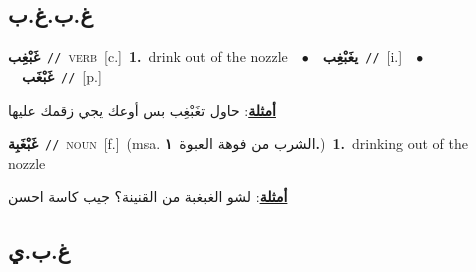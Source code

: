 \documentclass[10pt,a4paper,twoside]{article} %
\begin{document}
\begin{multicols}{2}
{{\vspace{-3mm}
\subsection*{\color{blue}\foreignlanguage{arabic}{غ.ب.غ.ب}\color{blue}{}} 

{\setlength\topsep{0pt}\textbf{\foreignlanguage{arabic}{غَبْغِب}}\ {\color{gray}\texttt{//}\color{black}}\ \textsc{verb}\ [c.]\ \textbf{1.}~drink out of the nozzle\ \ $\bullet$\ \ \setlength\topsep{0pt}\textbf{\foreignlanguage{arabic}{يغَبْغِب}}\ {\color{gray}\texttt{//}\color{black}}\ [i.]\ \ $\bullet$\ \ \setlength\topsep{0pt}\textbf{\foreignlanguage{arabic}{غَبْغَب}}\ {\color{gray}\texttt{//}\color{black}}\ [p.]\  \begin{flushright}\color{gray}\foreignlanguage{arabic}{\textbf{\underline{\foreignlanguage{arabic}{أمثلة}}}: حاول تغَبْغِب بس أوعك يجي زقمك عليها}\end{flushright}\color{black}} \vspace{2mm}

{\setlength\topsep{0pt}\textbf{\foreignlanguage{arabic}{غَبْغَبِة}}\ {\color{gray}\texttt{//}\color{black}}\ \textsc{noun}\ [f.]\ \color{gray}(msa. \foreignlanguage{arabic}{الشرب من فوهة العبوة}~\foreignlanguage{arabic}{\textbf{١.}})\color{black}\ \textbf{1.}~drinking out of the nozzle\  \begin{flushright}\color{gray}\foreignlanguage{arabic}{\textbf{\underline{\foreignlanguage{arabic}{أمثلة}}}: لشو الغبغبة من القنينة؟ جيب كاسة احسن}\end{flushright}\color{black}} \vspace{2mm}

\vspace{-3mm}
\subsection*{\color{blue}\foreignlanguage{arabic}{غ.ب.ي}\color{blue}{}} 

}}
\end{multicols}
\end{document}
